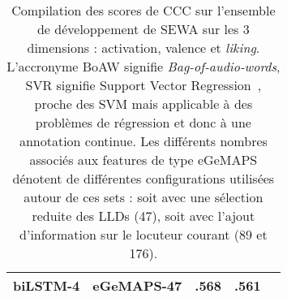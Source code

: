 \begin{table}[]
\begin{tabular}{| l | l | c | c | c |}
       biLSTM-4 &eGeMAPS-47    &.568  &\textbf{.561} & \\
       \hline
    \end{tabular}
    \caption{Compilation des scores de CCC sur l'ensemble de développement de SEWA sur les 3 dimensions : activation, valence et \textit{liking}. L'accronyme BoAW signifie \textit{Bag-of-audio-words}, SVR signifie Support Vector Regression~\cite{Smola2004}, proche des SVM mais applicable à des problèmes de régression et donc à une annotation continue. Les différents nombres associés aux features de type eGeMAPS dénotent de différentes configurations utilisées autour de ces sets : soit avec une sélection reduite des LLDs (47), soit avec l'ajout d'information sur le locuteur courant (89 et 176).}
    \label{tab:avec}
\end{table}
